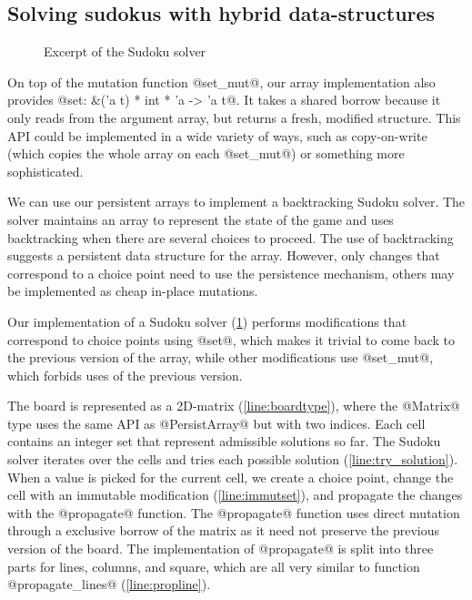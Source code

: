 \subsection{Solving sudokus with hybrid data-structures}

\begin{figure}[tp]
  
  \vspace{-15pt}
  \caption{Excerpt of the Sudoku solver}
  \label{ex:sudoku}
  \vspace{-10pt}
\end{figure}

On top of the mutation function @set_mut@, our array implementation
also provides @set: &('a t) * int * 'a -> 'a t@. It
takes a shared borrow because it only reads from the
argument array, but returns a fresh, modified structure.
%
This API could be implemented in a wide variety of ways, such as
copy-on-write (which copies the whole array on each @set_mut@)
or something more sophisticated\cite{DBLP:conf/ml/ConchonF07}.

We can use our persistent arrays
to implement a backtracking Sudoku solver.
The solver maintains an array to represent the state of
the game and uses backtracking when there are several choices to proceed.
The use of backtracking suggests a persistent data structure for the array.
However, only changes that correspond to a choice point need to use
the persistence mechanism, others may be implemented as
cheap in-place mutations.

Our implementation of a Sudoku solver (\cref{ex:sudoku}) performs
modifications that correspond to choice points using @set@,
which makes it trivial to come back to the previous version
of the array, while other modifications use @set_mut@, which
forbids uses of the previous version.

The board is represented as a 2D-matrix (\cref{line:boardtype}), where
the @Matrix@ type uses the same API as @PersistArray@
but with two indices.
Each cell contains an integer set that represent admissible solutions so far.
The Sudoku solver iterates over the cells and tries each possible solution (\cref{line:try_solution}).
When a value is picked for the current cell, we create a choice point,
change the cell with an immutable modification (\cref{line:immutset}), and propagate
the changes with the @propagate@ function.
The @propagate@ function uses direct mutation through a
exclusive borrow of the matrix as it need not preserve the previous
version of the board.
The implementation of @propagate@ is split into three parts
for lines, columns, and square, which are all very similar to function
@propagate_lines@ (\cref{line:propline}).

